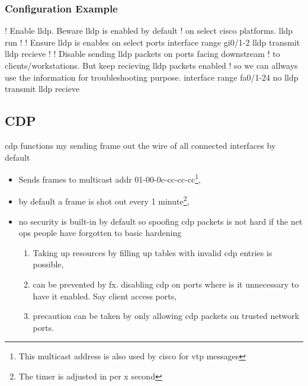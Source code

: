 \subsubsection{Configuration Example}

\begin{cisco}
! Enable lldp. Beware lldp is enabled by default
! on select cisco platforms.
lldp run
!
! Ensure lldp is enables on select ports
interface range gi0/1-2
 lldp transmit
 lldp recieve
!
! Disable sending lldp packets on ports facing downstream
! to clients/workstations. But keep recieving lldp packets enabled
! so we can allways use the information for troubleshooting purpose.
interface range fa0/1-24
 no lldp transmit
 lldp recieve
\end{cisco}

\newpage

\subsection{CDP}


\gls{cdp} functions my sending frame out the wire of all connected interfaces by default
\begin{itemize}
    \item Sends frames to multicast addr 01-00-0c-cc-cc-cc\footnote{This multicast address is also used by cisco for \gls{vtp} messages},
    \item by default a frame is shot out every 1 minute\footnote{The timer is adjusted in per x second},
    \item no security is built-in by default so spoofing \gls{cdp} packets is not hard if the net ops people have forgotten to basic hardening
    \begin{enumerate}
        \item Taking up resources by filling up tables with invalid \gls{cdp} entries\cite{wiki:CDP_Spoofing} is possible,
        \item can be prevented by fx. disabling \gls{cdp} on ports where is it unnecessary to have it enabled. Say client access ports,
        \item precaution can be taken by only allowing \gls{cdp} packets on trusted network ports.
    \end{enumerate}
\end{itemize}

